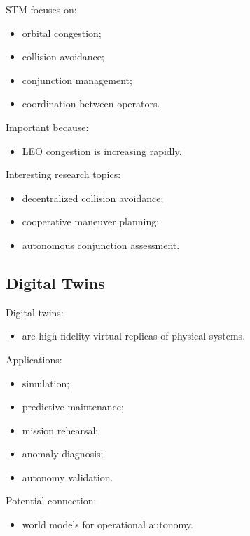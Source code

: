 \documentclass[10pt,a4paper,twocolumn]{article}
\begin{document}
STM focuses on:
\begin{itemize}
    \item orbital congestion;
    \item collision avoidance;
    \item conjunction management;
    \item coordination between operators.
\end{itemize}

Important because:
\begin{itemize}
    \item LEO congestion is increasing rapidly.
\end{itemize}

Interesting research topics:
\begin{itemize}
    \item decentralized collision avoidance;
    \item cooperative maneuver planning;
    \item autonomous conjunction assessment.
\end{itemize}


\subsection{Digital Twins}

Digital twins:
\begin{itemize}
    \item are high-fidelity virtual replicas of physical systems.
\end{itemize}

Applications:
\begin{itemize}
    \item simulation;
    \item predictive maintenance;
    \item mission rehearsal;
    \item anomaly diagnosis;
    \item autonomy validation.
\end{itemize}

Potential connection:
\begin{itemize}
    \item world models for operational autonomy.
\end{itemize}
\end{document}
